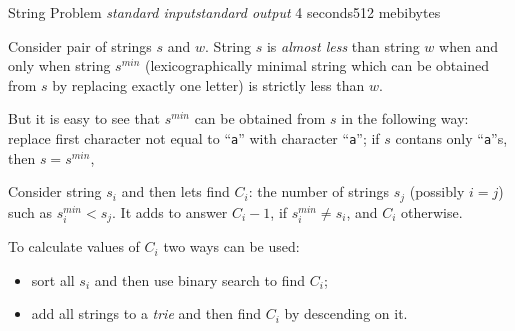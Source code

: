 \begin{problem}{String Problem}
{\textsl{standard input}}{\textsl{standard output}}
{4 seconds}{512 mebibytes}{}

Consider pair of strings $s$ and $w$. String $s$ is \emph{almost less} than
string $w$ when and only when string $s^{min}$
(lexicographically minimal string which can be obtained from $s$
by replacing exactly one letter) is strictly less than $w$.

But it is easy to see that $s^{min}$ can be obtained from $s$
in the following way:
replace first character not equal to ``\texttt{a}'' with character
``\texttt{a}''; if $s$ contans only ``\texttt{a}''s, then $s=s^{min}$,

Consider string $s_i$ and then lets find $C_i$: the number of strings
$s_j$ (possibly $i=j$) such as $s_i^{min} < s_j$.
It adds to answer $C_i-1$, if $s_i^{min} \ne s_i$, and $C_i$ otherwise.

To calculate values of $C_i$ two ways can be used:

\begin{itemize}
\item sort all $s_i$ and then use binary search to find $C_i$;
\item add all strings to a \textsl{trie} and then find $C_i$ by
descending on it.
\end{itemize}

\end{problem}
